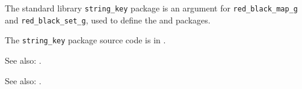 
The standard library {\tt string\_key} package is an argument for {\tt red\_black\_map\_g} and 
{\tt red\_black\_set\_g}, used to define the  and 
 packages.

The {\tt string\_key} package source code is in .

See also:  .

See also:  .



